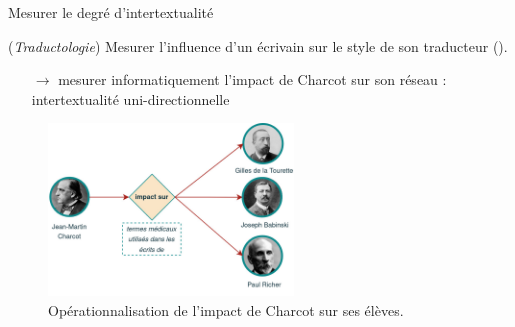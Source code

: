 \begin{frame}{Mesurer le degré d'intertextualité}

{\small(\textit{Traductologie}) Mesurer l'influence d'un écrivain sur le style de son traducteur {\footnotesize(\cite{oseki2007})}.}
\begin{itemize}
\item[$\rightarrow$] mesurer informatiquement l'impact de Charcot sur son réseau : intertextualité uni-directionnelle
\end{itemize}
\begin{figure}[!h]
    \centering
\includegraphics[width=65mm,scale=0.5]{pic/charcot_intertextualite.jpg}
    \caption{Opérationnalisation de l'impact de Charcot sur ses élèves.}
    \label{fig:my_label}
\end{figure}
\end{frame}

